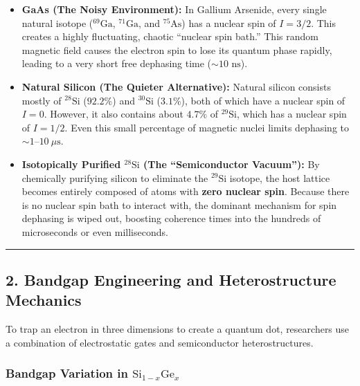 \documentclass[
]{article}
\providecommand{\tightlist}{%
  \setlength{\itemsep}{0pt}\setlength{\parskip}{0pt}}
\begin{document}
\begin{itemize}
\tightlist
\item
  \textbf{GaAs (The Noisy Environment):} In Gallium Arsenide, every
  single natural isotope (\(^{69}\text{Ga}\), \(^{71}\text{Ga}\), and
  \(^{75}\text{As}\)) has a nuclear spin of \(I = 3/2\). This creates a
  highly fluctuating, chaotic ``nuclear spin bath.'' This random
  magnetic field causes the electron spin to lose its quantum phase
  rapidly, leading to a very short free dephasing time
  (\(\sim 10\text{ ns}\)).
\item
  \textbf{Natural Silicon (The Quieter Alternative):} Natural silicon
  consists mostly of \(^{28}\text{Si}\) (\(92.2\%\)) and
  \(^{30}\text{Si}\) (\(3.1\%\)), both of which have a nuclear spin of
  \(I = 0\). However, it also contains about \(4.7\%\) of
  \(^{29}\text{Si}\), which has a nuclear spin of \(I = 1/2\). Even this
  small percentage of magnetic nuclei limits dephasing to
  \(\sim 1\text{--}10\ \mu\text{s}\).
\item
  \textbf{Isotopically Purified \(^{28}\text{Si}\) (The ``Semiconductor
  Vacuum''):} By chemically purifying silicon to eliminate the
  \(^{29}\text{Si}\) isotope, the host lattice becomes entirely composed
  of atoms with \textbf{zero nuclear spin}. Because there is no nuclear
  spin bath to interact with, the dominant mechanism for spin dephasing
  is wiped out, boosting coherence times into the hundreds of
  microseconds or even milliseconds.
\end{itemize}

\begin{center}\rule{0.5\linewidth}{0.5pt}\end{center}

\subsection{2. Bandgap Engineering and Heterostructure
Mechanics}\label{bandgap-engineering-and-heterostructure-mechanics}

To trap an electron in three dimensions to create a quantum dot,
researchers use a combination of electrostatic gates and semiconductor
heterostructures.

\subsubsection{\texorpdfstring{Bandgap Variation in
\(\text{Si}_{1-x}\text{Ge}_x\)}{Bandgap Variation in \textbackslash text\{Si\}\_\{1-x\}\textbackslash text\{Ge\}\_x}}\label{bandgap-variation-in-textsi_1-xtextge_x}
\end{document}
